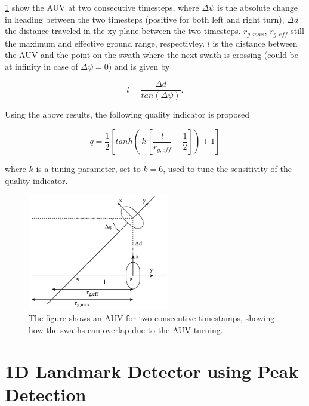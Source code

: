 \cref{fig:quality_ind} show the AUV at two consecutive timesteps, where $\Delta \psi$ is the absolute change in heading between the two timesteps (positive for both left and right turn), $\Delta d$ the distance traveled in the xy-plane between the two timesteps. $r_{g, max}$, $r_{g, eff}$ still the maximum and effective ground range, respectivley. $l$ is the distance between the AUV and the point on the swath where the next swath is crossing (could be at infinity in case of $\Delta \psi = 0$) and is given by

\begin{equation}
    l = \frac{\Delta d}{tan(\Delta \psi)}.
    \label{eq:l_qi}
\end{equation}

Using the above results, the following quality indicator is proposed

\begin{equation}
    q = \frac{1}{2}[tanh( \,k\, [\frac{l}{r_{g, eff}} - \frac{1}{2}]) + 1]
\end{equation}

where $k$ is a tuning parameter, set to $k = 6$, used to tune the sensitivity of the quality indicator. 

\begin{figure}
    \centering
    \includegraphics[width=0.55\textwidth]{figures/quality_ind.drawio.pdf}
    \caption{The figure shows an AUV for two consecutive timestamps, showing how the swaths can overlap due to the AUV turning.}
    \label{fig:quality_ind}
\end{figure}

\section{1D Landmark Detector using Peak Detection}

